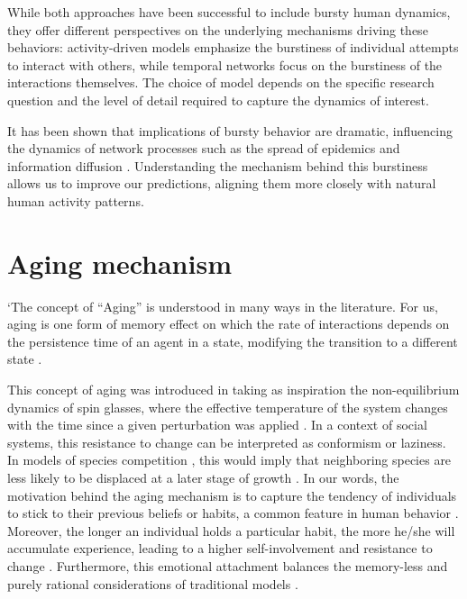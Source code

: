 While both approaches have been successful to include bursty human dynamics, they offer different perspectives on the underlying mechanisms driving these behaviors: activity-driven models emphasize the burstiness of individual attempts to interact with others, while temporal networks focus on the burstiness of the interactions themselves. The choice of model depends on the specific research question and the level of detail required to capture the dynamics of interest.

It has been shown that implications of bursty behavior are dramatic, influencing the dynamics of network processes such as the spread of epidemics and information diffusion \cite{Rocha2013Bursts, Wang2009Viruses}. Understanding the mechanism behind this burstiness allows us to improve our predictions, aligning them more closely with natural human activity patterns.

\section{\label{sec:Aging mechanism} Aging mechanism}

`The concept of ``Aging'' is understood in many ways in the literature. For us, aging is one form of memory effect on which the rate of interactions depends on the persistence time of an agent in a state, modifying the transition to a different state \cite{fernandez-gracia-2011,perez-2016,boguna-2014}. 

This concept of aging was introduced in \cite{stark-2008} taking as inspiration the non-equilibrium dynamics of spin glasses, where the effective temperature of the system changes with the time since a given perturbation was applied \cite{cugliandolo1993analytical}. In a context of social systems, this resistance to change can be interpreted as conformism or laziness. In models of species competition \cite{ravasz2004spreading}, this would imply that neighboring species are less likely to be displaced at a later stage of growth \cite{stark-2008}. In our words, the motivation behind the aging mechanism is to capture the tendency of individuals to stick to their previous beliefs or habits, a common feature in human behavior \cite{granovetter-1973}. Moreover, the longer an individual holds a particular habit, the more he/she will accumulate experience, leading to a higher self-involvement and resistance to change \cite{lejarraga2011let}. Furthermore, this emotional attachment balances the memory-less and purely rational considerations of traditional models \cite{granovetter-1985}.

